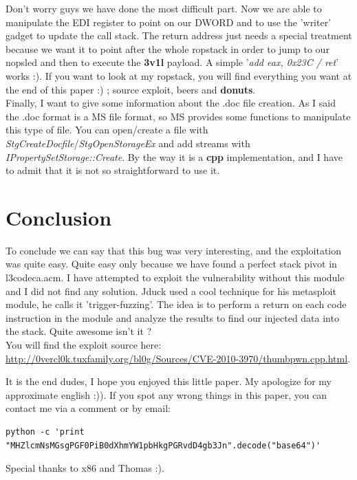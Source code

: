 \documentclass[12pt, titlepage]{article}
\begin{document}
Don't worry guys we have done the most difficult part. Now we are able to manipulate the EDI register to point on our DWORD and to use the 'writer' gadget to update the call stack. The return address just needs a special treatment because we want it to point after the whole ropstack in order to jump to our nopsled and then to execute the \textbf{3v1l} payload. A simple '\emph{add eax, 0x23C / ret}' works :).
If you want to look at my ropstack, you will find everything you want at the end of this paper :) ; source exploit, beers and \textbf{donuts}.\\
Finally, I want to give some information about the .doc file creation. As I said the .doc format is a MS file format, so MS provides some functions to manipulate this type of file. You can open/create a file with \emph{StgCreateDocfile}/\emph{StgOpenStorageEx} and add streams with \emph{IPropertySetStorage::Create}. By the way it is a \textbf{cpp} implementation, and I have to admit that it is not so straightforward to use it.
\clearpage

\part{Conclusion}
To conclude we can say that this bug was very interesting, and the exploitation was quite easy. Quite easy only because we have found a perfect stack pivot in l3codeca.acm. I have attempted to exploit the vulnerability without this module and I did not find any solution. Jduck used a cool technique for his metasploit module, he calls it 'trigger-fuzzing'. The idea is to perform a return on each code instruction in the module and analyze the results to find our injected data into the stack. Quite awesome isn't it ?\\
You will find the exploit source here: \href{http://0vercl0k.tuxfamily.org/bl0g/Sources/CVE-2010-3970/thumbpwn.cpp.html}{http://0vercl0k.tuxfamily.org/bl0g/Sources/CVE-2010-3970/thumbpwn.cpp.html}.

It is the end dudes, I hope you enjoyed this little paper. My apologize for my approximate english :)). If you spot any wrong things in this paper, you can contact me via a comment or by email:
\lstset{caption=Email address mystified, language=bash}
\begin{lstlisting}
python -c 'print "MHZlcmNsMGsgPGF0PiB0dXhmYW1pbHkgPGRvdD4gb3Jn".decode("base64")'
\end{lstlisting}

Special thanks to x86 and Thomas :).
\end{document}
